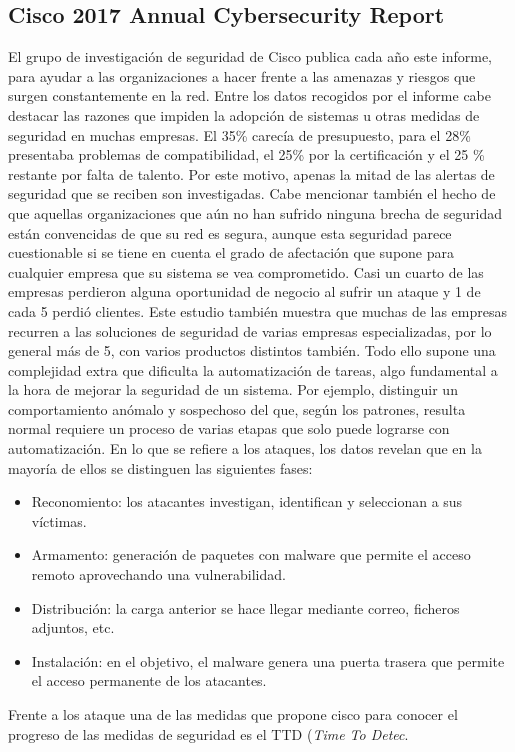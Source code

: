 \subsection{Cisco 2017 Annual Cybersecurity Report}
El grupo de investigación de seguridad de Cisco publica cada año este informe, para ayudar a las organizaciones a hacer frente a las amenazas y riesgos que surgen constantemente en la red. Entre los datos recogidos por el informe cabe destacar las razones que impiden la adopción de sistemas u otras medidas de seguridad en muchas empresas. El 35\% carecía de presupuesto, para el 28\% presentaba problemas de compatibilidad, el 25\% por la certificación y el 25 \% restante por falta de talento. Por este motivo, apenas la mitad de las alertas de seguridad que se reciben son investigadas. Cabe mencionar también el hecho de que aquellas organizaciones que aún no han sufrido ninguna brecha de seguridad están convencidas de que su red es segura, aunque esta seguridad parece cuestionable si se tiene en cuenta el grado de afectación que supone para cualquier empresa que su sistema se vea comprometido. Casi un cuarto de las empresas perdieron alguna oportunidad de negocio al sufrir un ataque y 1 de cada 5 perdió clientes. Este estudio también muestra que muchas de las empresas recurren a las soluciones de seguridad de varias empresas especializadas, por lo general más de 5, con varios productos distintos también. Todo ello supone una complejidad extra que dificulta la automatización de tareas, algo fundamental a la hora de mejorar la seguridad de un sistema. Por ejemplo, distinguir un comportamiento anómalo y sospechoso del que, según los patrones, resulta normal requiere un proceso de varias etapas que solo puede lograrse con automatización.
En lo que se refiere a los ataques, los datos revelan que en la mayoría de ellos se distinguen las siguientes fases:
\begin{itemize}
	\item Reconomiento: los atacantes investigan, identifican y seleccionan a sus víctimas.
	\item Armamento: generación de paquetes con malware que permite el acceso remoto aprovechando una vulnerabilidad.
	\item Distribución: la carga anterior se hace llegar mediante correo, ficheros adjuntos, etc.
	\item Instalación: en el objetivo, el malware genera una puerta trasera que permite el acceso permanente de los atacantes.
\end{itemize}
Frente a los ataque una de las medidas que propone cisco para conocer el progreso de las medidas de seguridad es el TTD (\textit{Time To Detec}.


